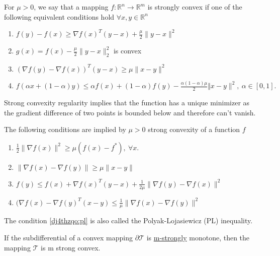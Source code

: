 \documentclass[varwidth=15cm, border=.5cm]{standalone}
\newcommand*\from{\colon}
\begin{document}
\begin{definition}[label=3rjrllrr, name=Strong Convexity Regularity]
	For \(\mu > 0\), we say that a mapping \( f\from\mathbb
	R^n\to\mathbb R^m \) is strongly convex if one of the following
	equivalent conditions hold \(\forall x,y\in\mathbb R^n\)

	\begin{enumerate}[label=\roman*\quad]
		\item \(f(y) - f(x) \geq \nabla f(x)^T(y-x) + \frac{\mu}{2}\lVert y - x\rVert^2\)
		\item \(g(x) = f(x) - \frac{\mu}{2}\lVert y-x\rVert^2_2\) is convex 
		\item \((\nabla f(y) - \nabla f(x))^T(y-x)\geq \mu\lVert x-y\rVert^2\)
		\item \(f(\alpha x+ (1-\alpha) y) \le \alpha f(x) + (1-\alpha) f(y) - \frac{\alpha (1-\alpha)\mu}{2}\Vert x-y\rVert^2,~\alpha \in [0,1].\)
	\end{enumerate}

	Strong convexity regularity implies that the function has a unique
	minimizer as the gradient difference of two points is bounded below and
	therefore can't vanish.

	\begin{remark}[label=dj4thzqo, name=Implications of Strong Convexity]
		The following conditions are implied by \(\mu>0\) strong
		convexity of a function $f$

		\begin{enumerate}[label=\roman*\quad,ref=(\roman*)]
			\item \label{dj4thzqo:pl} \(\frac{1}{2}\lVert\nabla f(x)\rVert^2\ge \mu (f(x)-f^*),~\forall x.\) 
			\item \(\lVert\nabla f(x) - \nabla f(y)\rVert \ge \mu \lVert x-y\rVert\)
			\item \(f(y)\le f(x)+\nabla f(x)^T(y-x)+\frac{1}{2\mu}\lVert\nabla f(y)- \nabla f(x)\rVert^2\)
			\item \((\nabla f(x) - \nabla f(y)^T(x-y) \le \frac{1}{\mu} \lVert\nabla f(x)-\nabla f(y)\rVert^2\)
		\end{enumerate}

		The condition \ref{dj4thzqo:pl} is also called the 
		Polyak-Lojasiewicz (PL) inequality. 
	\end{remark}

	\begin{remark}[label=_7nd1yv2, name=Strong Monotonicity of Subdifferentials]
		If the subdifferential of a convex mapping \(\partial\mathcal
		T\) is \hyperref[1_xd5vw5]{m-strongly} monotone, then the mapping 
		\(\mathcal T\) is m strong convex.
	\end{remark}


\end{definition}
\end{document}

